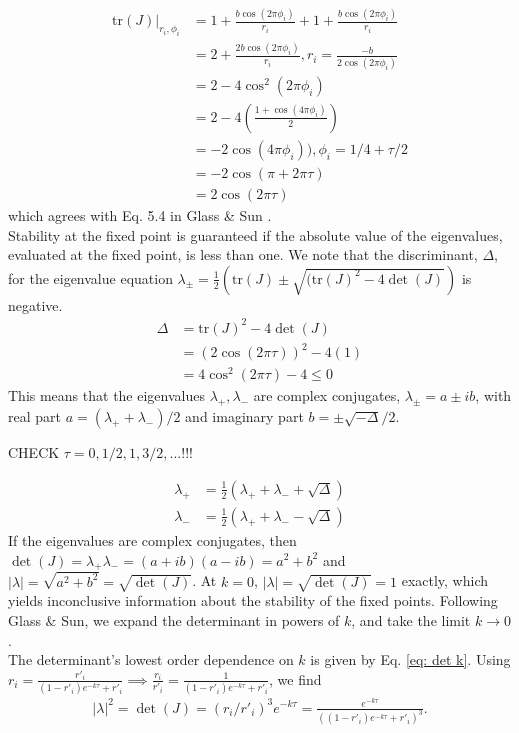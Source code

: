 \begin{align*}
    \text{tr}(J)|_{r_i,\phi_i} & = 1+\frac{b\cos(2\pi\phi_i)}{r_i} + 1+\frac{b\cos(2\pi\phi_i)}{r_i}\\
    & = 2+\frac{2b\cos(2\pi\phi_i)}{r_i}, r_i = \frac{-b}{2\cos(2\pi\phi_i)}\\
    & = 2-4\cos^2(2\pi\phi_i)\\
    & = 2-4(\frac{1+\cos(4\pi\phi_i)}{2})\\
    & = -2\cos(4\pi\phi_i)), \phi_i = 1/4+\tau/2\\
    & = -2\cos(\pi+2\pi\tau)\\
    & = 2\cos(2\pi\tau)
\end{align*} which agrees with Eq. 5.4 in Glass \& Sun \supercite{GLASS1994}.\\

Stability at the fixed point is guaranteed if the absolute value of the eigenvalues, evaluated at the fixed point, is less than one. We note that the discriminant, $\Delta$, for the eigenvalue equation $\lambda_\pm=\frac{1}{2}(\text{tr}(J)\pm \sqrt{(\text{tr}(J)^2-4\det(J)})$ is negative.
\begin{align*}
    \Delta & = \text{tr}(J)^2-4\det(J)\\
    & = (2\cos(2\pi\tau))^2-4(1)\\
    & = 4\cos^2(2\pi\tau)-4\leq0
\end{align*} This means that the eigenvalues $\lambda_+,\lambda_-$ are complex conjugates, $\lambda_\pm = a\pm ib$, with real part $a = (\lambda_++\lambda_-)/2$ and imaginary part $b=\pm\sqrt{-\Delta}/2$.

CHECK $\tau = 0, 1/2, 1, 3/2, ...$!!!

\begin{align*}
    \lambda_+ & = \frac{1}{2}(\lambda_++\lambda_- + \sqrt{\Delta})\\
    \lambda_- & = \frac{1}{2}(\lambda_++\lambda_- -\sqrt{\Delta})
\end{align*} If the eigenvalues are complex conjugates, then $\det(J)=\lambda_+\lambda_-=(a+ib)(a-ib)=a^2+b^2$ and $|\lambda| = \sqrt{a^2+b^2} = \sqrt{\det(J)}$. At $k=0$, $|\lambda| = \sqrt{\det(J)} = 1$ exactly, which yields inconclusive information about the stability of the fixed points. Following Glass \& Sun, we expand the determinant in powers of $k$, and take the limit $k\rightarrow 0$.\\

The determinant's lowest order dependence on $k$ is given by Eq. \ref{eq: det k}. Using $r_i=\frac{r'_i}{(1-r'_i)e^{-k\tau}+r'_i} \implies \frac{r_i}{r'_i} = \frac{1}{(1-r'_i)e^{-k\tau}+r'_i}$, we find
\begin{align}
    |\lambda|^2 = \det(J) = (r_i/r'_i)^3e^{-k\tau} = \frac{e^{-k\tau}}{((1-r'_i)e^{-k\tau}+r'_i)^3}. \nonumber
\end{align}

